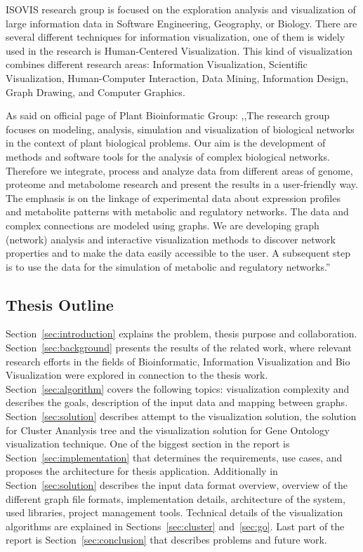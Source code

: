 ISOVIS research group is focused on the exploration analysis and visualization of large information data in Software Engineering, Geography, or Biology. There are several different techniques for information visualization, one of them is widely used in the research is Human-Centered Visualization. This kind of visualization combines different research areas: Information Visualization, Scientific Visualization, Human-Computer Interaction, Data Mining, Information Design, Graph Drawing, and Computer Graphics.


As said on official page of Plant Bioinformatic Group: ,,The research group focuses on modeling, analysis, simulation and visualization of biological networks in the context of plant biological problems. Our aim is the development of methods and software tools for the analysis of complex biological networks. Therefore we integrate, process and analyze data from different areas of genome, proteome and
metabolome research and present the results in a user-friendly way. The emphasis is on the linkage of experimental data about expression profiles and metabolite patterns with metabolic and regulatory networks. The data and complex connections are modeled using graphs. We are developing graph (network) analysis and interactive visualization methods to discover network properties and to make the data easily accessible to the user. A subsequent step is to use the data for the simulation of metabolic and regulatory networks.''~\cite{PBG}


\subsection{Thesis Outline}
\label{sec:structure}

Section~\ref{sec:introduction} explains the problem, thesis purpose and collaboration. Section~\ref{sec:background} presents the results of the related work, where relevant research efforts in the fields of Bioinformatic, Information Visualization and Bio Visualization were explored in connection to the thesis work. Section~\ref{sec:algorithm} covers the following topics: visualization complexity and describes the goals, description of the input data and mapping between graphs. Section~\ref{sec:solution} describes attempt to the visualization solution, the solution for Cluster Ananlysis tree and the visualization solution for Gene Ontology visualization technique. One of the biggest section in the report is Section~\ref{sec:implementation} that determines the requirements, use cases, and proposes the architecture for thesis application.
Additionally in Section~\ref{sec:solution} describes the input data format overview, overview of the different graph file formats, implementation details, architecture of the system, used libraries, project management tools. Technical details of the visualization algorithms are explained in Sections~\ref{sec:cluster} and~\ref{sec:go}. Last part of the report is Section~\ref{sec:conclusion} that describes problems and future work.

